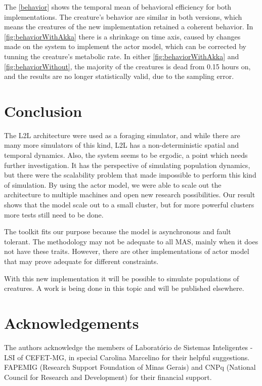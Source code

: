 \documentclass{aamas2017}
\begin{document}
The \autoref{behavior} shows the temporal mean of behavioral efficiency for both implementations. The creature's behavior are similar in both versions, which means the creatures of the new implementation retained a coherent behavior. In \autoref{fig:behaviorWithAkka} there is a shrinkage on time axis, caused by changes made on the system to implement the actor model, which can be corrected by tunning the creature's metabolic rate. In either \autoref{fig:behaviorWithAkka} and \autoref{fig:behaviorWithout}, the majority of the creatures is dead from 0.15 hours on, and the results are no longer statistically valid, due to the sampling error.

\section{Conclusion}
\label{sec:conclusion}
The L2L architecture were used as a foraging simulator, and while there are many more simulators of this kind, L2L has a non-deterministic spatial and temporal dynamics. Also, the system seems to be ergodic, a point which needs further investigation. It has the perspective of simulating population dynamics, but there were the scalability problem that made impossible to perform this kind of simulation. By using the actor model, we were able to scale out the architecture to multiple machines and open new research possibilities. Our result shows that the model scale out to a small cluster, but for more powerful clusters more tests still need to be done.

The toolkit fits our purpose because the model is asynchronous and fault tolerant. The methodology may not be adequate to all MAS, mainly when it does not have these traits. However, there are other implementations of actor model that may prove adequate for different constraints.

With this new implementation it will be possible to simulate populations of creatures. A work is being done in this topic and will be published elsewhere.

\section{Acknowledgements}
\label{sec:ack}
The authors acknowledge the members of Laborat\'orio de Sistemas Inteligentes - LSI of CEFET-MG, in special Carolina Marcelino for their helpful suggestions. FAPEMIG (Research Support Foundation of Minas Gerais) and CNPq (National Council for Research and Development) for their financial support.
\end{document}
